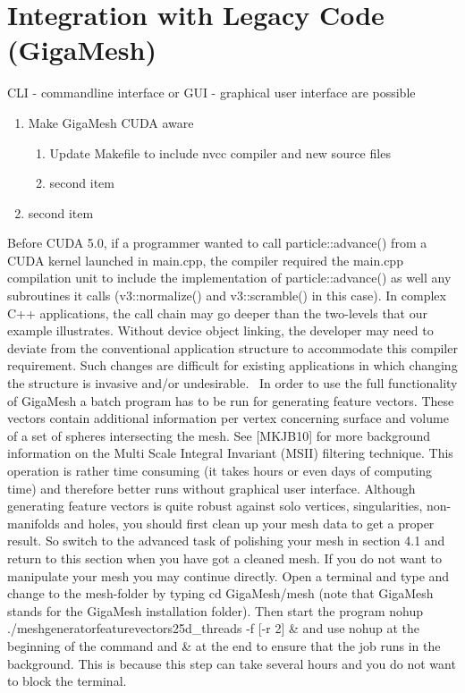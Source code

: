 \documentclass[openany]{book}
\begin{document}
\section{Integration with Legacy Code (GigaMesh)}
CLI - commandline interface or GUI - graphical user interface are possible
\begin{enumerate}
\item Make GigaMesh CUDA aware
	\begin{enumerate}
	\item Update Makefile to include nvcc compiler and new source files
	\item second item
	\end{enumerate}
\item second item
\end{enumerate}
Before CUDA 5.0, if a programmer wanted to call particle::advance() from a CUDA kernel launched in main.cpp, the compiler required the main.cpp compilation unit to include the implementation of particle::advance() as well any subroutines it calls (v3::normalize() and v3::scramble() in this case). In complex C++ applications, the call chain may go deeper than the two-levels that our example illustrates. Without device object linking, the developer may need to deviate from the conventional application structure to accommodate this compiler requirement. Such changes are difficult for existing applications in which changing the structure is invasive and/or undesirable.~\cite{Cuda14}
In order to use the full functionality of GigaMesh a batch program has to be run for generating feature vectors. These vectors contain additional information per vertex concerning surface and volume of a set of spheres intersecting the mesh. See [MKJB10] for more background information on the Multi Scale Integral Invariant (MSII) filtering technique. This operation is rather time consuming (it takes hours or even days of computing time) and therefore better runs without graphical user interface. Although generating feature vectors is quite robust against solo vertices, singularities, non-manifolds and holes, you should first clean up your mesh data to get a proper result. So switch to the advanced task of polishing your mesh in section 4.1 and return to this section when you have got a cleaned mesh. If you do not want to manipulate your mesh you may continue directly. Open a terminal and type and change to the mesh-folder by typing cd GigaMesh/mesh (note that GigaMesh stands for the GigaMesh installation folder). Then start the program 
nohup ./meshgeneratorfeaturevectors25d\_threads -f [-r 2] \& 
and use nohup at the beginning of the command and \& at the end to ensure that the job runs in the background. This is because this step can take several hours and you do not want to block the terminal.~\cite[p.~19]{Giga17}
\end{document}
